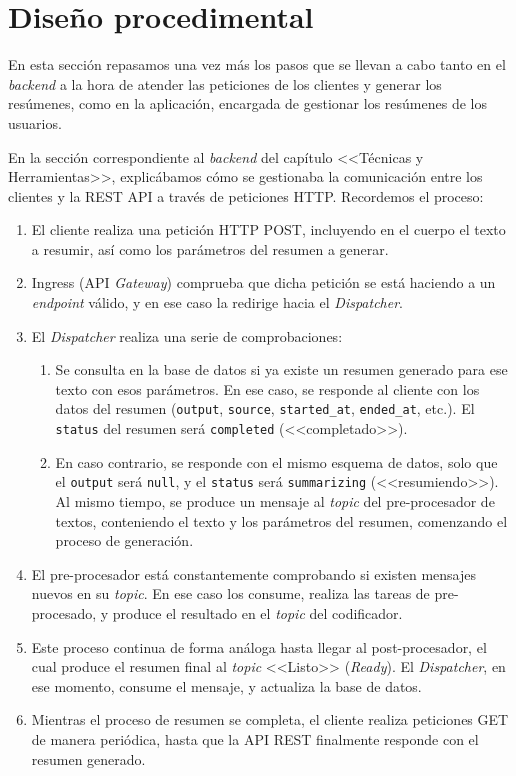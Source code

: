 \newpage

\section{Diseño procedimental}

En esta sección repasamos una vez más los pasos que se llevan a cabo tanto en el \emph{backend} a la hora de atender las peticiones de los clientes y generar los resúmenes, como en la aplicación, encargada de gestionar los resúmenes de los usuarios.

En la sección correspondiente al \emph{backend} del capítulo <<Técnicas y Herramientas>>, explicábamos cómo se gestionaba la comunicación entre los clientes y la REST API a través de peticiones HTTP. Recordemos el proceso:

\begin{enumerate}
	\item El cliente realiza una petición HTTP POST, incluyendo en el cuerpo el texto a resumir, así como los parámetros del resumen a generar.
	
	\item Ingress (API \emph{Gateway}) comprueba que dicha petición se está haciendo a un \emph{endpoint} válido, y en ese caso la redirige hacia el \emph{Dispatcher}.
	
	\item El \emph{Dispatcher} realiza una serie de comprobaciones:
	\begin{enumerate}	
		\item Se consulta en la base de datos si ya existe un resumen generado para ese texto con esos parámetros. En ese caso, se responde al cliente con los datos del resumen (\texttt{output}, \texttt{source}, \texttt{started\_at}, \texttt{ended\_at}, etc.). El \texttt{status} del resumen será \texttt{completed} (<<completado>>).
		
		\item En caso contrario, se responde con el mismo esquema de datos, solo que el \texttt{output} será \texttt{null}, y el \texttt{status} será \texttt{summarizing} (<<resumiendo>>). Al mismo tiempo, se produce un mensaje al \emph{topic} del pre-procesador de textos, conteniendo el texto y los parámetros del resumen, comenzando el proceso de generación.
	\end{enumerate}
	
	\item El pre-procesador está constantemente comprobando si existen mensajes nuevos en su \emph{topic}. En ese caso los consume, realiza las tareas de pre-procesado, y produce el resultado en el \emph{topic} del codificador.
	
	\item Este proceso continua de forma análoga hasta llegar al post-procesador, el cual produce el resumen final al \emph{topic} <<Listo>> (\emph{Ready}). El \emph{Dispatcher}, en ese momento, consume el mensaje, y actualiza la base de datos.
	
	\item Mientras el proceso de resumen se completa, el cliente realiza peticiones GET de manera periódica, hasta que la API REST finalmente responde con el resumen generado.
\end{enumerate}

